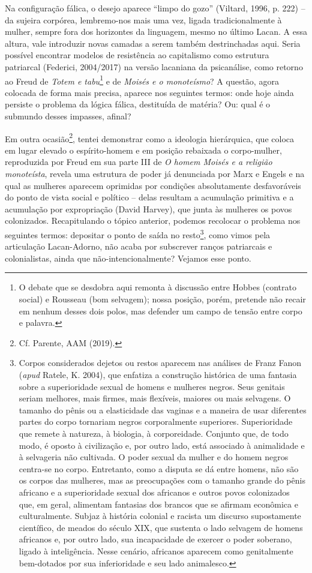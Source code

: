 Na configuração fálica, o desejo aparece ``limpo do gozo'' (Viltard,
1996, p. 222) -- da sujeira corpórea, lembremo-nos mais uma vez, ligada
tradicionalmente à mulher, sempre fora dos horizontes da linguagem,
mesmo no último Lacan. A essa altura, vale introduzir novas camadas a
serem também destrinchadas aqui. Seria possível encontrar modelos de
resistência ao capitalismo como estrutura patriarcal (Federici,
2004/2017) na versão lacaniana da psicanálise, como retorno ao Freud de
\emph{Totem e tabu}\footnote{O debate que se desdobra aqui remonta à
  discussão entre Hobbes (contrato social) e Rousseau (bom selvagem);
  nossa posição, porém, pretende não recair em nenhum desses dois polos,
  mas defender um campo de tensão entre corpo e palavra.} e de
\emph{Moisés e o monoteísmo}? A questão, agora colocada de forma mais
precisa, aparece nos seguintes termos: onde hoje ainda persiste o
problema da lógica fálica, destituída de matéria? Ou: qual é o submundo
desses impasses, afinal?

Em outra ocasião\footnote{Cf. Parente, AAM (2019).}, tentei demonstrar
como a ideologia hierárquica, que coloca em lugar elevado o
espírito-homem e em posição rebaixada o corpo-mulher, reproduzida por
Freud em sua parte III de \emph{O homem Moisés e a religião monoteísta},
revela uma estrutura de poder já denunciada por Marx e Engels e na qual
as mulheres aparecem oprimidas por condições absolutamente desfavoráveis
do ponto de vista social e político -- delas resultam a acumulação
primitiva e a acumulação por expropriação (David Harvey), que junta às
mulheres os povos colonizados. Recapitulando o tópico anterior, podemos
recolocar o problema nos seguintes termos: depositar o ponto de saída no
resto\footnote{Corpos considerados dejetos ou restos aparecem nas
  análises de Franz Fanon (\emph{apud} Ratele, K. 2004), que enfatiza a
  construção histórica de uma fantasia sobre a superioridade sexual de
  homens e mulheres negros. Seus genitais seriam melhores, mais firmes,
  mais flexíveis, maiores ou mais selvagens. O tamanho do pênis ou a
  elasticidade das vaginas e a maneira de usar diferentes partes do
  corpo tornariam negros corporalmente superiores. Superioridade que
  remete à natureza, à biologia, à corporeidade. Conjunto que, de todo
  modo, é oposto à civilização e, por outro lado, está associado à
  animalidade e à selvageria não cultivada. O poder sexual da mulher e
  do homem negros centra-se no corpo. Entretanto, como a disputa se dá
  entre homens, não são os corpos das mulheres, mas as preocupações com
  o tamanho grande do pênis africano e a superioridade sexual dos
  africanos e outros povos colonizados que, em geral, alimentam
  fantasias dos brancos que se afirmam econômica e culturalmente. Subjaz
  à história colonial e racista um discurso supostamente científico, de
  meados do século XIX, que sustenta o lado selvagem de homens africanos
  e, por outro lado, sua incapacidade de exercer o poder soberano,
  ligado à inteligência. Nesse cenário, africanos aparecem como
  genitalmente bem-dotados por sua inferioridade e seu lado animalesco.},
como vimos pela articulação Lacan-Adorno, não acaba por subscrever
ranços patriarcais e colonialistas, ainda que não-intencionalmente?
Vejamos esse ponto.

